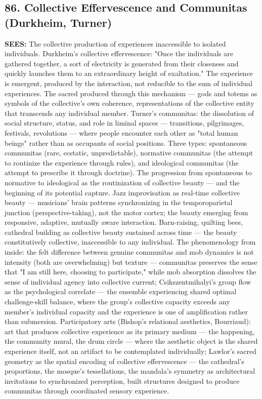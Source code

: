 \subsection*{86. Collective Effervescence and Communitas (Durkheim, Turner)}


\textbf{SEES:} The collective production of experiences inaccessible to isolated individuals. Durkheim's collective effervescence: "Once the individuals are gathered together, a sort of electricity is generated from their closeness and quickly launches them to an extraordinary height of exaltation." The experience is emergent, produced by the interaction, not reducible to the sum of individual experiences. The sacred produced through this mechanism — gods and totems as symbols of the collective's own coherence, representations of the collective entity that transcends any individual member. Turner's communitas: the dissolution of social structure, status, and role in liminal spaces — transitions, pilgrimages, festivals, revolutions — where people encounter each other as "total human beings" rather than as occupants of social positions. Three types: spontaneous communitas (rare, ecstatic, unpredictable), normative communitas (the attempt to routinize the experience through rules), and ideological communitas (the attempt to prescribe it through doctrine). The progression from spontaneous to normative to ideological as the routinization of collective beauty — and the beginning of its potential capture. Jazz improvisation as real-time collective beauty — musicians' brain patterns synchronizing in the temporoparietal junction (perspective-taking), not the motor cortex; the beauty emerging from responsive, adaptive, mutually aware interaction. Barn-raising, quilting bees, cathedral building as collective beauty sustained across time — the beauty constitutively collective, inaccessible to any individual. The phenomenology from inside: the felt difference between genuine communitas and mob dynamics is not intensity (both are overwhelming) but texture — communitas preserves the sense that "I am still here, choosing to participate," while mob absorption dissolves the sense of individual agency into collective current; Csikszentmihalyi's group flow as the psychological correlate — the ensemble experiencing shared optimal challenge-skill balance, where the group's collective capacity exceeds any member's individual capacity and the experience is one of amplification rather than submersion. Participatory arts (Bishop's relational aesthetics, Bourriaud): art that produces collective experience as its primary medium — the happening, the community mural, the drum circle — where the aesthetic object is the shared experience itself, not an artifact to be contemplated individually; Lawlor's sacred geometry as the spatial encoding of collective effervescence — the cathedral's proportions, the mosque's tessellations, the mandala's symmetry as architectural invitations to synchronized perception, built structures designed to produce communitas through coordinated sensory experience.


